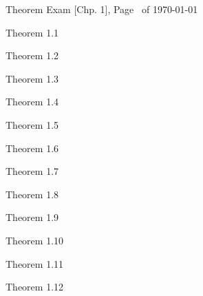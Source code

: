 \documentclass{exam}
\begin{document}
\pagestyle{head}
\runningheadrule
{}
{Theorem Exam [Chp. 1], Page \thepage\ of \numpages}
{\today}

\begin{questions}

\question
Theorem 1.1 \fillin[][3in]

\question
Theorem 1.2 \fillin[][3in]


\question
Theorem 1.3 \fillin[][3in]


\question
Theorem 1.4 \fillin[][3in]

\question
Theorem 1.5 \fillin[][3in]

\question
Theorem 1.6 \fillin[][3in]


\question
Theorem 1.7 \fillin[][3in]

\question
Theorem 1.8 \fillin[][3in]


\question
Theorem 1.9 \fillin[][3in]

\newpage

\question
Theorem 1.10 \fillin[][3in]

\question
Theorem 1.11 \fillin[][3in]

\question
Theorem 1.12 \fillin[][3in]

\end{questions}
\end{document}
